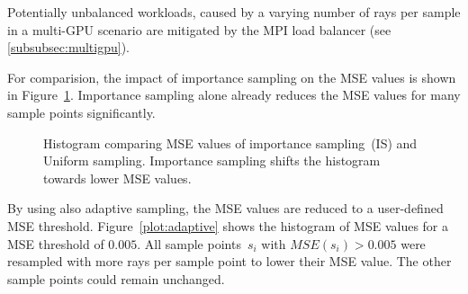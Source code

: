 Potentially unbalanced workloads, caused by a varying number of rays per
sample in a multi-GPU scenario are mitigated by the MPI load balancer
(see \cref{subsubsec:multigpu}).

For comparision, the impact of importance sampling on the MSE values
is shown in Figure~\ref{plot:importance2}.  Importance sampling
alone already reduces the MSE values for many sample points
significantly.
\begin{figure}[H]
  \centerline{
    }
  \caption{Histogram comparing MSE values of importance sampling~(IS)
    and Uniform sampling. Importance sampling shifts the histogram
    towards lower MSE values. }
  \label{plot:importance2}
\end{figure}
By using also adaptive sampling, the MSE values are reduced to a
user-defined MSE threshold.  Figure~\ref{plot:adaptive} shows the
histogram of MSE values for a MSE threshold of $0.005$. All sample
points~$s_i$ with $MSE(s_i) > 0.005$ were resampled with more rays per
sample point to lower their MSE value. The other sample points could
remain unchanged.
